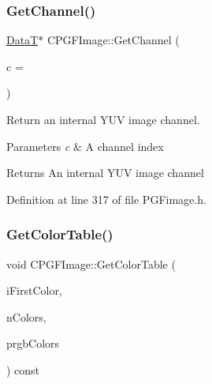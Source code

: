 \subsubsection{\texorpdfstring{GetChannel()}{GetChannel()}}
{\footnotesize\ttfamily \mbox{\hyperlink{PGFtypes_8h_acb1ee3f52ccfad782dcaa0abd79e5d05}{DataT}}$\ast$ C\+P\+G\+F\+Image\+::\+Get\+Channel (\begin{DoxyParamCaption}\item[{int}]{c = {} }\end{DoxyParamCaption})\hspace{0.3cm}{\ttfamily [inline]}}

Return an internal Y\+UV image channel. 
\begin{DoxyParams}{Parameters}
{\em c} & A channel index \\
\hline
\end{DoxyParams}
\begin{DoxyReturn}{Returns}
An internal Y\+UV image channel 
\end{DoxyReturn}


Definition at line 317 of file P\+G\+Fimage.\+h.


\begin{DoxyCode}{0}

\end{DoxyCode}
\mbox{\label{classCPGFImage_af9e57bf57786030eab6ed17df9d9342e}} 
\subsubsection{\texorpdfstring{GetColorTable()}{GetColorTable()}\hspace{0.1cm}{\footnotesize\ttfamily [1/2]}}
{\footnotesize\ttfamily void C\+P\+G\+F\+Image\+::\+Get\+Color\+Table (\begin{DoxyParamCaption}\item[{U\+I\+N\+T32}]{i\+First\+Color,  }\item[{U\+I\+N\+T32}]{n\+Colors,  }\item[{R\+G\+B\+Q\+U\+AD $\ast$}]{prgb\+Colors }\end{DoxyParamCaption}) const}

